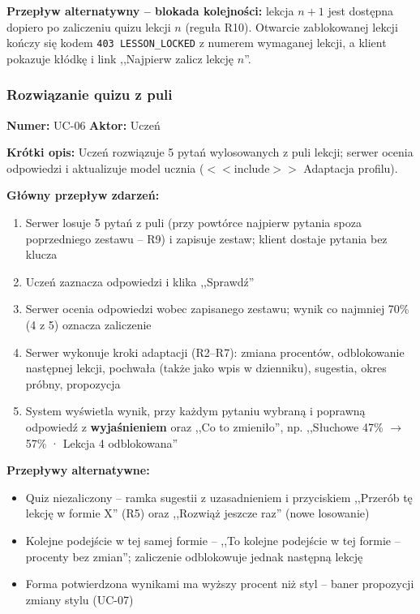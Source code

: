 \textbf{Przepływ alternatywny -- blokada kolejności:} lekcja $n+1$ jest dostępna dopiero po zaliczeniu quizu lekcji $n$ (reguła R10). Otwarcie zablokowanej lekcji kończy się kodem \texttt{403 LESSON\_LOCKED} z numerem wymaganej lekcji, a klient pokazuje kłódkę i link ,,Najpierw zalicz lekcję $n$''.

\subsubsection{Rozwiązanie quizu z puli}
\textbf{Numer:} UC-06 \quad \textbf{Aktor:} Uczeń

\textbf{Krótki opis:} Uczeń rozwiązuje 5 pytań wylosowanych z puli lekcji; serwer ocenia odpowiedzi i aktualizuje model ucznia ($<<$include$>>$ Adaptacja profilu).

\textbf{Główny przepływ zdarzeń:}
\begin{enumerate}[leftmargin=*]
    \item Serwer losuje 5 pytań z puli (przy powtórce najpierw pytania spoza poprzedniego zestawu -- R9) i zapisuje zestaw; klient dostaje pytania bez klucza
    \item Uczeń zaznacza odpowiedzi i klika ,,Sprawdź''
    \item Serwer ocenia odpowiedzi wobec zapisanego zestawu; wynik co najmniej 70\% (4 z 5) oznacza zaliczenie
    \item Serwer wykonuje kroki adaptacji (R2--R7): zmiana procentów, odblokowanie następnej lekcji, pochwała (także jako wpis w dzienniku), sugestia, okres próbny, propozycja
    \item System wyświetla wynik, przy każdym pytaniu wybraną i poprawną odpowiedź z \textbf{wyjaśnieniem} oraz ,,Co to zmieniło'', np. ,,Słuchowe 47\% $\to$ 57\% · Lekcja 4 odblokowana''
\end{enumerate}

\textbf{Przepływy alternatywne:}
\begin{itemize}[leftmargin=*]
    \item Quiz niezaliczony -- ramka sugestii z uzasadnieniem i przyciskiem ,,Przerób tę lekcję w formie X'' (R5) oraz ,,Rozwiąż jeszcze raz'' (nowe losowanie)
    \item Kolejne podejście w tej samej formie -- ,,To kolejne podejście w tej formie -- procenty bez zmian''; zaliczenie odblokowuje jednak następną lekcję
    \item Forma potwierdzona wynikami ma wyższy procent niż styl -- baner propozycji zmiany stylu (UC-07)
\end{itemize}

